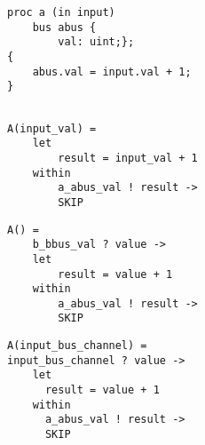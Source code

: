 \begin{minipage}[t]{.98\linewidth}
    \centering
\begin{minipage}[t]{0.45\linewidth}
  \begin{verbatim}
proc a (in input)
    bus abus {
        val: uint;};
{
    abus.val = input.val + 1;
}
  \end{verbatim}
  \label{lst:smeil_input_parameter}
\end{minipage}
\hspace{0.6cm}
\begin{minipage}[t]{0.45\linewidth}
\begin{verbatim}

A(input_val) =
    let
        result = input_val + 1
    within
        a_abus_val ! result ->
        SKIP
\end{verbatim}
\label{lst:cspm_input_value}
\end{minipage}
\hspace{0.6cm}
\vspace{0.5cm}
\newline
\begin{minipage}[t]{0.45\linewidth}
\begin{verbatim}
A() =
    b_bbus_val ? value ->
    let
        result = value + 1
    within
        a_abus_val ! result ->
        SKIP
\end{verbatim}
\label{lst:cspm_no_input}
\end{minipage}
\hspace{0.6cm}
\begin{minipage}[t]{0.45\linewidth}
\begin{verbatim}
A(input_bus_channel) =
input_bus_channel ? value ->
    let
      result = value + 1
    within
      a_abus_val ! result ->
      SKIP
\end{verbatim}
\label{lst:cspm_channel_reads_input}
\end{minipage}
\vspace{0.3cm}
\label{lst:cspm_input_values_examples}
\vspace{1cm}
\end{minipage}

